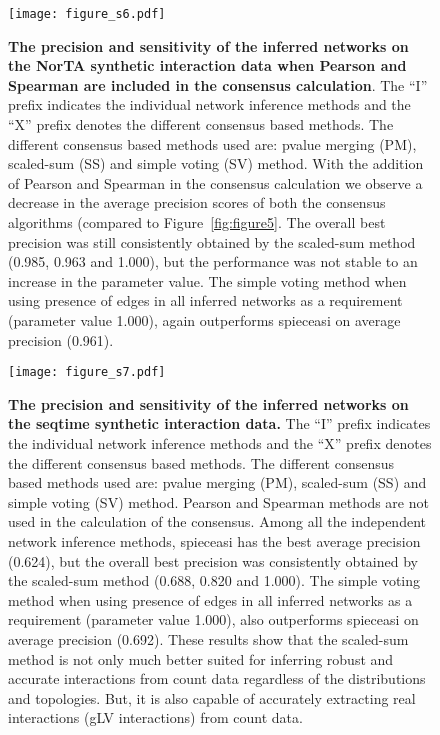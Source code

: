  \begin{figure}[H]
    \centering
    \texttt{[image: figure\_s6.pdf]}
  \end{figure}
  \begin{figure}[H]
    \centering
      \caption{
        \textbf{The precision and sensitivity of the inferred networks on the NorTA synthetic interaction data when Pearson and Spearman are included in the consensus calculation}.
        The ``I'' prefix indicates the individual network inference methods and the ``X'' prefix denotes the different consensus based methods.
        The different consensus based methods used are: pvalue merging (PM), scaled-sum (SS) and simple voting (SV) method.
        With the addition of Pearson and Spearman in the consensus calculation we observe a decrease in the average precision scores of both the consensus algorithms (compared to Figure~\ref{fig:figure5}.
        The overall best precision was still consistently obtained by the scaled-sum method (0.985, 0.963 and 1.000), but the performance was not stable to an increase in the parameter value.
        The simple voting method when using presence of edges in all inferred networks as a requirement (parameter value 1.000), again outperforms \ac{spieceasi} on average precision (0.961).
      }
    \label{fig:figure_s6}
  \end{figure}
  \FloatBarrier
  \newpage

  \begin{figure}[H]
    \centering
    \texttt{[image: figure\_s7.pdf]}
  \end{figure}
  \begin{figure}[H]
    \centering
      \caption{
        \textbf{The precision and sensitivity of the inferred networks on the seqtime synthetic interaction data.}
        The ``I'' prefix indicates the individual network inference methods and the ``X'' prefix denotes the different consensus based methods.
        The different consensus based methods used are: pvalue merging (PM), scaled-sum (SS) and simple voting (SV) method.
        Pearson and Spearman methods are not used in the calculation of the consensus.
        Among all the independent network inference methods, \ac{spieceasi} has the best average precision (0.624), but the overall best precision was consistently obtained by the scaled-sum method (0.688, 0.820 and 1.000).
        The simple voting method when using presence of edges in all inferred networks as a requirement (parameter value 1.000), also outperforms \ac{spieceasi} on average precision (0.692).
        These results show that the scaled-sum method is not only much better suited for inferring robust and accurate interactions from count data regardless of the distributions and topologies.
        But, it is also capable of accurately extracting real interactions (gLV interactions) from count data.
      }
    \label{fig:figure_s7}
  \end{figure}
  \FloatBarrier
  \newpage

